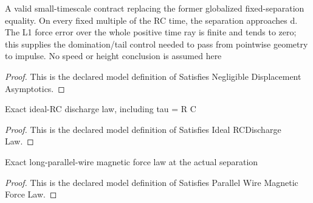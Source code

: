 \begin{definition}
  \label{def:physics:phyx-mini-0971:phyxminiproblems-problemphyxmini0971-satisfiesnegligibledisplacementasymptotics}
  A valid small-timescale contract replacing the former globalized fixed-separation equality. On every fixed multiple of the RC time, the separation approaches d. The L1 force error over the whole positive time ray is finite and tends to zero; this supplies the domination/tail control needed to pass from pointwise geometry to impulse. No speed or height conclusion is assumed here
\end{definition}
\begin{proof}
  This is the declared model definition of Satisfies Negligible Displacement Asymptotics.
\end{proof}
\begin{definition}
  \label{def:physics:phyx-mini-0971:phyxminiproblems-problemphyxmini0971-satisfiesidealrcdischargelaw}
  Exact ideal-RC discharge law, including tau = R C
\end{definition}
\begin{proof}
  This is the declared model definition of Satisfies Ideal RCDischarge Law.
\end{proof}
\begin{definition}
  \label{def:physics:phyx-mini-0971:phyxminiproblems-problemphyxmini0971-satisfiesparallelwiremagneticforcelaw}
  Exact long-parallel-wire magnetic force law at the actual separation
\end{definition}
\begin{proof}
  This is the declared model definition of Satisfies Parallel Wire Magnetic Force Law.
\end{proof}

